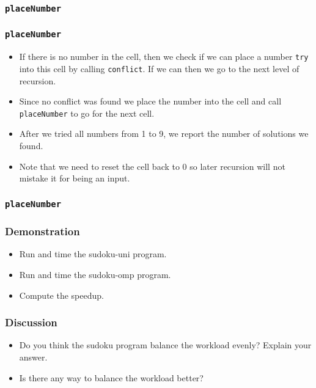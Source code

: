 \documentclass{beamer}
\begin{document}
\begin{frame}
\frametitle{\tt placeNumber} 
\end{frame}

\begin{frame}
\frametitle{\tt placeNumber}
\begin{itemize}
\item If there is no number in the cell, then we check if we can place
  a number {\tt try} into this cell by calling {\tt conflict}.  If we
  can then we go to the next level of recursion.
\item Since no conflict was found we place the number into the cell
  and call {\tt placeNumber} to go for the next cell.
\item After we tried all numbers from 1 to 9, we report the number of
  solutions we found.
\item Note that we need to reset the cell back to 0 so later recursion
  will not mistake it for being an input.
\end{itemize}
\end{frame}


\begin{frame}
\frametitle{\tt placeNumber} 
\end{frame}

\begin{frame}
\frametitle{Demonstration}
\begin{itemize}
\item Run and time the sudoku-uni program.
\item Run and time the sudoku-omp program.
\item Compute the speedup.
\end{itemize}
\end{frame}

\begin{frame}
\frametitle{Discussion}
\begin{itemize}
\item Do you think the sudoku program balance the workload evenly?
  Explain your answer.
\item Is there any way to balance the workload better?
\end{itemize}
\end{frame}
\end{document}
